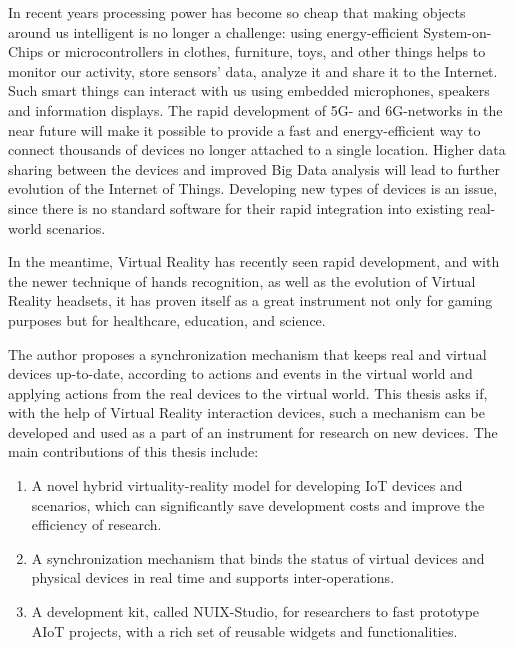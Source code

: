\begin{abstract*}

  In recent years processing power has become so cheap that making objects around us intelligent is no longer a challenge: using energy-efficient System-on-Chips or microcontrollers in clothes, furniture, toys, and other things helps to monitor our activity, store sensors' data, analyze it and share it to the Internet. Such smart things can interact with us using embedded microphones, speakers and information displays. The rapid development of 5G- and 6G-networks in the near future will make it possible to provide a fast and energy-efficient way to connect thousands of devices no longer attached to a single location. Higher data sharing between the devices and improved Big Data analysis will lead to further evolution of the Internet of Things. Developing new types of devices is an issue, since there is no standard software for their rapid integration into existing real-world scenarios.
   
  In the meantime, Virtual Reality has recently seen rapid development, and with the newer technique of hands recognition, as well as the evolution of Virtual Reality headsets, it has proven itself as a great instrument not only for gaming purposes but for healthcare, education, and science.
   
  The author proposes a synchronization mechanism that keeps real and virtual devices up-to-date, according to actions and events in the virtual world and applying actions from the real devices to the virtual world. This thesis asks if, with the help of Virtual Reality interaction devices, such a mechanism can be developed and used as a part of an instrument for research on new devices. The main contributions of this thesis include:
  
  \begin{enumerate}
      \item A novel hybrid virtuality-reality model for developing IoT devices and scenarios, which can significantly save development costs and improve the efficiency of research. 
      \item A synchronization mechanism that binds the status of virtual devices and physical devices in real time and supports inter-operations. 
      \item A development kit, called NUIX-Studio, for researchers to fast prototype AIoT projects, with a rich set of reusable widgets and functionalities.
  \end{enumerate}
  
\end{abstract*}

